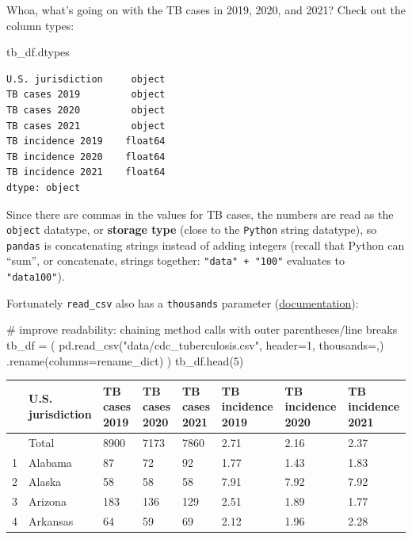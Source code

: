 \documentclass[
  letterpaper,
  DIV=11,
  numbers=noendperiod]{scrreprt}
\newenvironment{Shaded}{\begin{snugshade}}{\end{snugshade}}
\newcommand{\CommentTok}[1]{\textcolor[rgb]{0.37,0.37,0.37}{#1}}
\newcommand{\DecValTok}[1]{\textcolor[rgb]{0.68,0.00,0.00}{#1}}
\newcommand{\NormalTok}[1]{\textcolor[rgb]{0.00,0.23,0.31}{#1}}
\newcommand{\OperatorTok}[1]{\textcolor[rgb]{0.37,0.37,0.37}{#1}}
\newcommand{\StringTok}[1]{\textcolor[rgb]{0.13,0.47,0.30}{#1}}
\begin{document}
Whoa, what's going on with the TB cases in 2019, 2020, and 2021? Check
out the column types:

\begin{Shaded}
\begin{Highlighting}[]
\NormalTok{tb\_df.dtypes}
\end{Highlighting}
\end{Shaded}

\begin{verbatim}
U.S. jurisdiction     object
TB cases 2019         object
TB cases 2020         object
TB cases 2021         object
TB incidence 2019    float64
TB incidence 2020    float64
TB incidence 2021    float64
dtype: object
\end{verbatim}

Since there are commas in the values for TB cases, the numbers are read
as the \texttt{object} datatype, or \textbf{storage type} (close to the
\texttt{Python} string datatype), so \texttt{pandas} is concatenating
strings instead of adding integers (recall that Python can ``sum'', or
concatenate, strings together: \texttt{"data"\ +\ "100"} evaluates to
\texttt{"data100"}).

Fortunately \texttt{read\_csv} also has a \texttt{thousands} parameter
(\href{https://pandas.pydata.org/docs/reference/api/pandas.read_csv.html}{documentation}):

\begin{Shaded}
\begin{Highlighting}[]
\CommentTok{\# improve readability: chaining method calls with outer parentheses/line breaks}
\NormalTok{tb\_df }\OperatorTok{=}\NormalTok{ (}
\NormalTok{    pd.read\_csv(}\StringTok{"data/cdc\_tuberculosis.csv"}\NormalTok{, header}\OperatorTok{=}\DecValTok{1}\NormalTok{, thousands}\OperatorTok{=}\StringTok{\textquotesingle{},\textquotesingle{}}\NormalTok{)}
\NormalTok{    .rename(columns}\OperatorTok{=}\NormalTok{rename\_dict)}
\NormalTok{)}
\NormalTok{tb\_df.head(}\DecValTok{5}\NormalTok{)}
\end{Highlighting}
\end{Shaded}

\begin{longtable}[]{@{}llllllll@{}}
\toprule\noalign{}
& U.S. jurisdiction & TB cases 2019 & TB cases 2020 & TB cases 2021 & TB
incidence 2019 & TB incidence 2020 & TB incidence 2021 \\
\midrule\noalign{}
\endhead
\bottomrule\noalign{}
\endlastfoot
0 & Total & 8900 & 7173 & 7860 & 2.71 & 2.16 & 2.37 \\
1 & Alabama & 87 & 72 & 92 & 1.77 & 1.43 & 1.83 \\
2 & Alaska & 58 & 58 & 58 & 7.91 & 7.92 & 7.92 \\
3 & Arizona & 183 & 136 & 129 & 2.51 & 1.89 & 1.77 \\
4 & Arkansas & 64 & 59 & 69 & 2.12 & 1.96 & 2.28 \\
\end{longtable}
\end{document}
